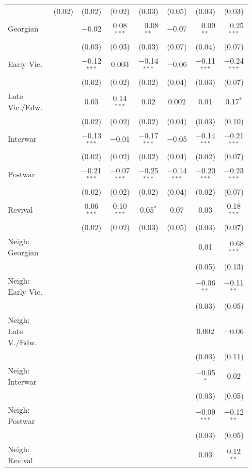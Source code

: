 \begin{table}[!htbp]
\begin{tabular}{@{\extracolsep{5pt}}lccccccc}
  & (0.02) & (0.02) & (0.02) & (0.03) & (0.05) & (0.03) & (0.03) \\ 
  Georgian &  & $-$0.02 & 0.08$^{***}$ & $-$0.08$^{**}$ & $-$0.07 & $-$0.09$^{**}$ & $-$0.25$^{***}$ \\ 
  &  & (0.03) & (0.03) & (0.03) & (0.07) & (0.04) & (0.07) \\ 
  Early Vic. &  & $-$0.12$^{***}$ & 0.003 & $-$0.14$^{***}$ & $-$0.06 & $-$0.11$^{***}$ & $-$0.24$^{***}$ \\ 
  &  & (0.02) & (0.02) & (0.02) & (0.04) & (0.03) & (0.07) \\ 
  Late Vic./Edw. &  & 0.03 & 0.14$^{***}$ & 0.02 & 0.002 & 0.01 & 0.17$^{*}$ \\ 
  &  & (0.02) & (0.02) & (0.02) & (0.04) & (0.03) & (0.10) \\ 
  Interwar &  & $-$0.13$^{***}$ & $-$0.01 & $-$0.17$^{***}$ & $-$0.05 & $-$0.14$^{***}$ & $-$0.21$^{***}$ \\ 
  &  & (0.02) & (0.02) & (0.02) & (0.04) & (0.02) & (0.07) \\ 
  Postwar &  & $-$0.21$^{***}$ & $-$0.07$^{***}$ & $-$0.25$^{***}$ & $-$0.14$^{***}$ & $-$0.20$^{***}$ & $-$0.23$^{***}$ \\ 
  &  & (0.02) & (0.02) & (0.02) & (0.04) & (0.02) & (0.07) \\ 
  Revival &  & 0.06$^{***}$ & 0.10$^{***}$ & 0.05$^{*}$ & 0.07 & 0.03 & 0.18$^{***}$ \\ 
  &  & (0.02) & (0.02) & (0.03) & (0.05) & (0.03) & (0.07) \\ 
  Neigh: Georgian &  &  &  &  &  & 0.01 & $-$0.68$^{***}$ \\ 
  &  &  &  &  &  & (0.05) & (0.13) \\ 
  Neigh: Early Vic. &  &  &  &  &  & $-$0.06$^{**}$ & $-$0.11$^{**}$ \\ 
  &  &  &  &  &  & (0.03) & (0.05) \\ 
  Neigh: Late V./Edw. &  &  &  &  &  & 0.002 & $-$0.06 \\ 
  &  &  &  &  &  & (0.03) & (0.11) \\ 
  Neigh: Interwar &  &  &  &  &  & $-$0.05$^{*}$ & 0.02 \\ 
  &  &  &  &  &  & (0.03) & (0.05) \\ 
  Neigh: Postwar &  &  &  &  &  & $-$0.09$^{***}$ & $-$0.12$^{**}$ \\ 
  &  &  &  &  &  & (0.03) & (0.05) \\ 
  Neigh: Revival &  &  &  &  &  & 0.03 & 0.12$^{**}$ \\ 

\end{tabular}
\end{table}
